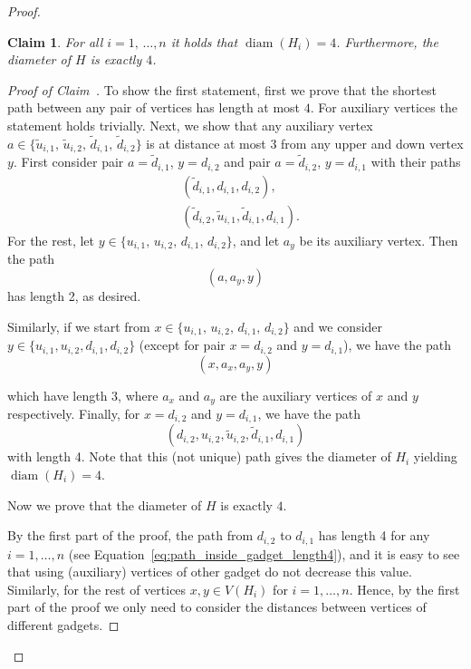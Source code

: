 \documentclass[11pt, twoside]{article}
\numberwithin{equation}{section}
\numberwithin{table}{section}
\numberwithin{figure}{section}
\newtheorem{Claim}[theorem]{Claim}
\theoremstyle{definition}
\theoremstyle{definition}
\theoremstyle{definition}
\newenvironment{claimproof}{%
  \begin{proof}[Proof of Claim~\theClaim]%
  \renewcommand{\qedsymbol}{$\lhd$}%
}{%
	\end{proof}%
}
\newcommand{\tu}[1]{\widetilde{u}_{#1}}
\newcommand{\td}[1]{\widetilde{d}_{#1}}
\begin{document}
\begin{appendices}
\begin{proof}
\begin{Claim}
\label{claim:Diam_Hi_Is_Four}
    For all $i=1, \, \dots, n$ it holds that $\operatorname{diam}(H_i) = 4$. Furthermore, the diameter of $H$ is exactly $4$.
\end{Claim}
\begin{claimproof}
    To show the first statement, first we prove that the shortest path between any pair of vertices has length at most $4$. For auxiliary vertices the statement holds trivially. Next, we show that any auxiliary vertex $a \in \{ \tu{i,1}, \, \tu{i,2}, \, \td{i,1}, \, \td{i,2}\}$ is at distance at most 3 from any upper and down vertex $y$. First consider pair  $a=\td{i,1}$, $y=d_{i,2}$ and pair $a=\td{i,2}$, $y=d_{i,1}$ with their paths
    \begin{align}
        &(\td{i,1},d_{i,1}, d_{i,2}), \label{eq:path_inside_gadget_aux1}\\
        &(\td{i,2}, \tu{i,1} , \td{i,1},d_{i,1}). \label{eq:path_inside_gadget_aux2}
    \end{align}
    For the rest, let $y \in \{ u_{i,1}, \, u_{i,2}, \, d_{i,1}, \, d_{i,2}\}$, and let $a_y$ be its auxiliary vertex. Then the path 
     \begin{equation}\label{eq:path_inside_gadget_allAux}
         (a,a_y,y)
     \end{equation}
     has length 2, as desired.
    
    Similarly, if we start from $x \in \{ u_{i,1}, \, u_{i,2}, \, d_{i,1}, \, d_{i,2} \}$ and we consider $y \in \{ u_{i,1},u_{i,2},d_{i,1},d_{i,2} \}$ (except for pair $x =d_{i,2}$ and $y=d_{i,1}$), we have the path    
    \begin{equation}
        (x,a_x,a_y,y) \label{eq:path_inside_gadget}
    \end{equation}
    
    which have length 3,  where $a_x$ and $a_y$ are the auxiliary vertices of $x$ and $y$ respectively. Finally, for $x =d_{i,2}$ and $y=d_{i,1}$, we have the path 
    \begin{equation}
        (d_{i,2},u_{i,2},\tu{i,2},\td{i,1},d_{i,1}) \label{eq:path_inside_gadget_length4}
    \end{equation}    
    with length 4. Note that this (not unique) path gives the diameter of $H_i$ yielding $\operatorname{diam}(H_i) = 4$.

    Now we prove that the diameter of $H$ is exactly $4$. 

    By the first part of the proof, the path from $d_{i,2}$ to $d_{i,1}$ has length 4 for any $i = 1, \dots, n$ (see Equation~\ref{eq:path_inside_gadget_length4}), and it is easy to see that using (auxiliary) vertices of other gadget do not decrease this value. 
    Similarly, for the rest of vertices $x,y \in V(H_i)$ for $i= 1, \dots, n$. 
    Hence, by the first part of the proof we only need to consider the distances between vertices of different gadgets.


\end{claimproof}
\end{proof}
\end{appendices}
\end{document}
